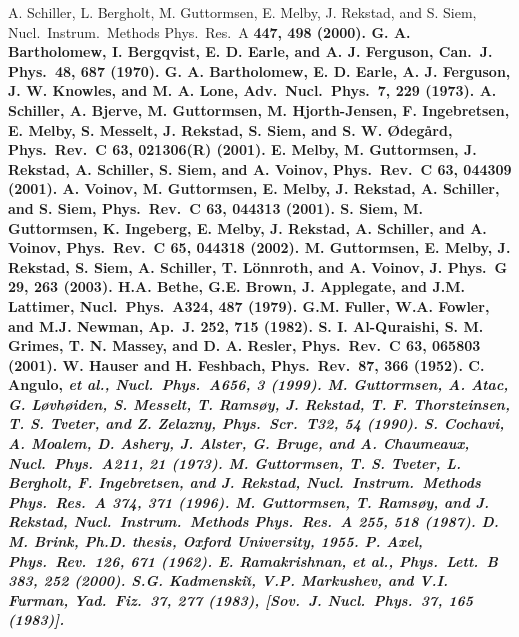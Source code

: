 \begin{multicols}{2}
\begin{references}
A. Schiller, L. Bergholt, M. Guttormsen, E. Melby, J. Rekstad, 
and S. Siem, Nucl.\ Instrum.\ Methods Phys.\ Res.\ A \bf 447\rm, 498 (2000).
G. A. Bartholomew, I. Bergqvist, E. D. Earle, and A. J. Ferguson,
Can.\ J. Phys.\ \bf 48\rm, 687 (1970).
G. A. Bartholomew, E. D. Earle, A. J. Ferguson, J. W. Knowles, 
and M. A. Lone, Adv.\ Nucl.\ Phys.\ \bf 7\rm, 229 (1973). 
A. Schiller, A. Bjerve, M. Guttormsen, M. Hjorth-Jensen, F. 
Ingebretsen, E. Melby, S. Messelt, J. Rekstad, S. Siem, and S. W. 
{\O}deg{\aa}rd, Phys.\ Rev.\ C \bf 63\rm, 021306(R) (2001).
E. Melby, M. Guttormsen, J. Rekstad, A. Schiller, S. Siem, and A.
Voinov, Phys.\ Rev.\ C \bf 63\rm, 044309 (2001).
A. Voinov, M. Guttormsen, E. Melby, J. Rekstad, A. Schiller, and
S. Siem, Phys.\ Rev.\ C \bf 63\rm, 044313 (2001).
S. Siem, M. Guttormsen, K. Ingeberg, E. Melby, J. Rekstad, A.
Schiller, and A. Voinov, Phys.\ Rev.\ C \bf 65\rm, 044318 (2002).
M. Guttormsen, E. Melby, J. Rekstad, S. Siem, A. Schiller, T. 
L{\"o}nnroth, and A. Voinov, J. Phys.\ G \bf 29\rm, 263 (2003).
H.A. Bethe, G.E. Brown, J. Applegate, and J.M. Lattimer, Nucl.\ 
Phys.\ \bf A324\rm, 487 (1979).
G.M. Fuller, W.A. Fowler, and M.J. Newman, Ap.\ J. \bf 252\rm, 
715 (1982).
S. I. Al-Quraishi, S. M. Grimes, T. N. Massey, and D. A. Resler,
Phys.\ Rev.\ C \bf 63\rm, 065803 (2001).
W. Hauser and H. Feshbach, Phys.\ Rev.\ \bf 87\rm, 366 (1952).
\bibitem{AA99}C. Angulo, \sl et al.\rm, Nucl.\ Phys.\ \bf A656\rm, 3 (1999).
\bibitem{GA90}M. Guttormsen, A. Atac, G. L{\o}vh{\o}iden, S. Messelt, T. 
Rams{\o}y, J. Rekstad, T. F. Thorsteinsen, T. S. Tveter, and Z. Zelazny, Phys.\
Scr.\ \bf T32\rm, 54 (1990). 
\bibitem{CM73}S. Cochavi, A. Moalem, D. Ashery, J. Alster, G. Bruge, and A. 
Chaumeaux, Nucl.\ Phys.\ \bf A211\rm, 21 (1973).
\bibitem{GT96}M. Guttormsen, T. S. Tveter, L. Bergholt, F. Ingebretsen, and J.
Rekstad, Nucl.\ Instrum.\ Methods Phys.\ Res.\ A \bf 374\rm, 371 (1996).
\bibitem{GR87}M. Guttormsen, T. Rams{\o}y, and J. Rekstad, Nucl.\ Instrum.\ 
Methods Phys.\ Res.\ A \bf 255\rm, 518 (1987).
\bibitem{Br55}D. M. Brink, Ph.D. thesis, Oxford University, 1955.
\bibitem{Ax62}P. Axel, Phys.\ Rev.\ \bf 126\rm, 671 (1962).
\bibitem{RA00}E. Ramakrishnan, \sl et al.\rm, Phys.\ Lett.\ B \bf 383\rm, 252 
(2000). 
\bibitem{KM83}S.G. Kadmenski\u\i, V.P. Markushev, and V.I. Furman, Yad.\ Fiz.\ 
\bf 37\rm, 277 (1983), [Sov.\ J. Nucl.\ Phys.\ \bf 37\rm, 165 (1983)]. 

\end{references}
\end{multicols}
